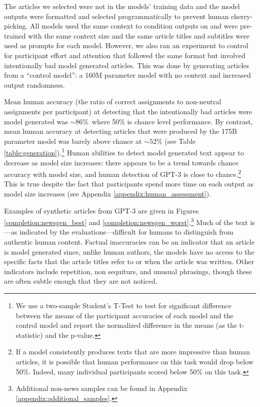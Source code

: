 The articles we selected were not in the models’ training data and the model outputs were formatted and selected programmatically to prevent human cherry-picking. All models used the same context to condition outputs on and were pre-trained with the same context size and the same article titles and subtitles were used as prompts for each model. However, we also ran an experiment to control for participant effort and attention that followed the same format but involved intentionally bad model generated articles. This was done by generating articles from a ``control model'': a 160M parameter model with no context and increased output randomness.

Mean human accuracy (the ratio of correct assignments to non-neutral assignments per participant) at detecting that the intentionally bad articles were model generated was  $\sim86\%$\, where 50\% is chance level performance. By contrast, mean human accuracy at detecting articles that were produced by the 175B parameter model was barely above chance at $\sim52\%$ (see Table \ref{table:generation}).\footnote{We use a two-sample Student’s T-Test to test for significant difference between the means of the participant accuracies of each model and the control model and report the normalized difference in the means (as the t-statistic) and the p-value.} Human abilities to detect model generated text appear to decrease as model size increases: there appears to be a trend towards chance accuracy with model size, and human detection of GPT-3 is close to chance.\footnote{If a model consistently produces texts that are more impressive than human articles, it is possible that human performance on this task would drop below 50\%. Indeed, many individual participants scored below 50\% on this task.} This is true despite the fact that participants spend more time on each output as model size increases (see Appendix \ref{appendix:human_assessment}).




 Examples of synthetic articles from GPT-3 are given in Figures \ref{completion:newsgen_best} and \ref{completion:newsgen_worst}.\footnote{Additional non-news samples can be found in Appendix \ref{appendix:additional_samples}.} Much of the text is---as indicated by the evaluations---difficult for humans to distinguish from authentic human content. Factual inaccuracies can be an indicator that an article is model generated since, unlike human authors, the models have no access to the specific facts that the article titles refer to or when the article was written. Other indicators include repetition, non sequiturs, and unusual phrasings, though these are often subtle enough that they are not noticed. 
 
